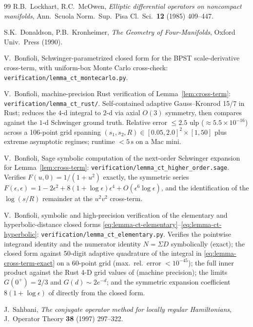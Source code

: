 \documentclass[11pt,letterpaper]{article}
\theoremstyle{definition}
\begin{document}
\begin{thebibliography}{99}
 R.B.\ Lockhart, R.C.\ McOwen, \emph{Elliptic differential operators on noncompact manifolds}, Ann.\ Scuola Norm.\ Sup.\ Pisa Cl.\ Sci.\ \textbf{12} (1985) 409--447.

 S.K.\ Donaldson, P.B.\ Kronheimer, \emph{The Geometry of Four-Manifolds}, Oxford Univ.\ Press (1990).

 V.\ Bonfioli, Schwinger-parametrized closed form for the BPST scale-derivative cross-term, with uniform-box Monte Carlo cross-check: \texttt{verification/lemma\_ct\_montecarlo.py}.

 V.\ Bonfioli, machine-precision Rust verification of Lemma~\ref{lem:cross-term}: \texttt{verification/lemma\_ct\_rust/}. Self-contained adaptive Gauss--Kronrod 15/7 in Rust; reduces the $4$-d integral to $2$-d via axial $O(3)$ symmetry, then compares against the $1$-d Schwinger ground truth. Relative error $\le 2.5$ ulp ($\approx 5.5\times 10^{-16}$) across a 106-point grid spanning $(s_1, s_2, R) \in [0.05, 2.0]^2 \times [1, 50]$ plus extreme asymptotic regimes; runtime $< 5\,\mathrm{s}$ on a Mac mini.

 V.\ Bonfioli, Sage symbolic computation of the next-order Schwinger expansion for Lemma~\ref{lem:cross-term}: \texttt{verification/lemma\_ct\_higher\_order.sage}. Verifies $F(u, 0) = 1/(1+u^2)$ exactly, the symmetric series $F(\epsilon, \epsilon) = 1 - 2\epsilon^2 + 8(1+\log\epsilon)\epsilon^4 + O(\epsilon^6\log\epsilon)$, and the identification of the $\log(s/R)$ remainder at the $u^2 v^2$ cross-term.

 V.\ Bonfioli, symbolic and high-precision verification of the elementary and hyperbolic-distance closed forms \eqref{eq:lemma-ct-elementary}--\eqref{eq:lemma-ct-hyperbolic}: \texttt{verification/lemma\_ct\_elementary.py}. Verifies the pointwise integrand identity and the numerator identity $N = \Sigma D$ symbolically (exact); the closed form against 50-digit adaptive quadrature of the integral in \eqref{eq:lemma-cross-term-exact} on a 60-point grid (max.\ rel.\ error $< 10^{-45}$); the full inner product against the Rust 4-D grid values of \cite{lemma-ct-rust} (machine precision); the limits $G(0^+) = 2/3$ and $G(d) \sim 2e^{-d}$; and the symmetric expansion coefficient $8(1 + \log\epsilon)$ of \cite{lemma-ct-higher-order} directly from the closed form.

 J.\ Sahbani, \emph{The conjugate operator method for locally regular Hamiltonians}, J.\ Operator Theory \textbf{38} (1997) 297--322.


\end{thebibliography}
\end{document}
